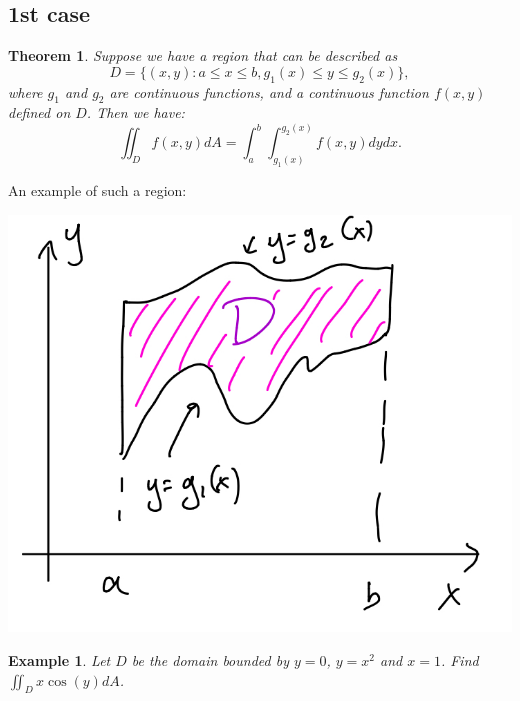 \documentclass[12pt]{article}
\newtheorem{example}{Example}
\newtheorem{theorem}{Theorem}
\begin{document}
\subsection*{1st case}
\begin{theorem} Suppose we have a region that can be described as $$D=\{ (x,y):a\leq x \leq b, g_1(x)\leq y\leq g_2(x)\},$$ where $g_1$ and $g_2$ are continuous functions, and a continuous function $f(x,y)$ defined on $D$. Then we have: $$\iint_D f(x,y) dA =\int_a^b \int_{g_1(x)}^{g_2(x)} f(x,y)dy dx.$$
\end{theorem}
An example of such a region:

\includegraphics[scale=.2]{type_1.jpeg}
\begin{example}
Let $D$ be the domain bounded by $y=0$, $y=x^2$ and $x=1$. Find $\iint_D x\cos(y) dA$. 
\end{example}
\end{document}
